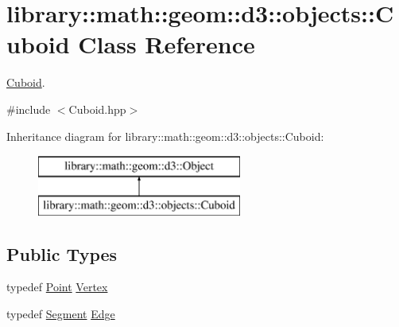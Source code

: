 \hypertarget{classlibrary_1_1math_1_1geom_1_1d3_1_1objects_1_1_cuboid}{}\section{library\+:\+:math\+:\+:geom\+:\+:d3\+:\+:objects\+:\+:Cuboid Class Reference}
\label{classlibrary_1_1math_1_1geom_1_1d3_1_1objects_1_1_cuboid}


\hyperlink{classlibrary_1_1math_1_1geom_1_1d3_1_1objects_1_1_cuboid}{Cuboid}.  




{\ttfamily \#include $<$Cuboid.\+hpp$>$}

Inheritance diagram for library\+:\+:math\+:\+:geom\+:\+:d3\+:\+:objects\+:\+:Cuboid\+:\begin{figure}[H]
\begin{center}
\leavevmode
\includegraphics[height=2.000000cm]{classlibrary_1_1math_1_1geom_1_1d3_1_1objects_1_1_cuboid}
\end{center}
\end{figure}
\subsection*{Public Types}
\begin{DoxyCompactItemize}
\item 
typedef \hyperlink{classlibrary_1_1math_1_1geom_1_1d3_1_1objects_1_1_point}{Point} \hyperlink{classlibrary_1_1math_1_1geom_1_1d3_1_1objects_1_1_cuboid_ad9600791c8ac7f1253dc94417ec12f3c}{Vertex}
\item 
typedef \hyperlink{classlibrary_1_1math_1_1geom_1_1d3_1_1objects_1_1_segment}{Segment} \hyperlink{classlibrary_1_1math_1_1geom_1_1d3_1_1objects_1_1_cuboid_a743ee54e5fb8e2e649c254e69abed69c}{Edge}
\end{DoxyCompactItemize}
